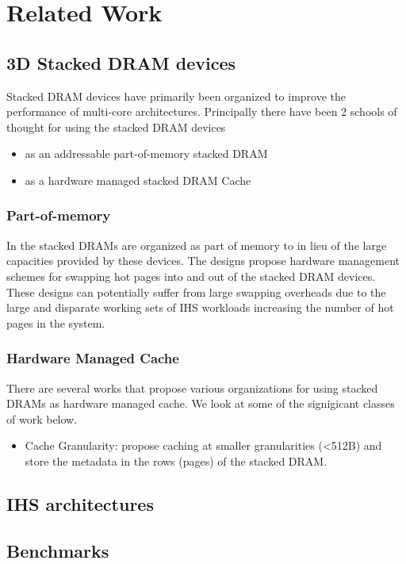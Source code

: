 \chapter{Related Work} \label{related-work}
\section{3D Stacked DRAM devices}
Stacked DRAM devices have primarily been organized to improve the performance of multi-core architectures. Principally there have been 2 schools of thought for using the stacked DRAM devices 
\begin{itemize}
	\item as an addressable part-of-memory stacked DRAM 
	\item as a hardware managed stacked DRAM Cache
\end{itemize}
\subsection{Part-of-memory}
In \cite{pom,cameo} the stacked DRAMs are organized as part of memory to in lieu of the large capacities provided by these devices. The designs propose hardware management schemes for swapping hot pages into and out of the stacked DRAM devices. These designs can potentially suffer from large swapping overheads due to the large and disparate working sets of IHS workloads increasing the number of hot pages in the system.
\subsection{Hardware Managed Cache}
There are several works that propose various organizations for using stacked DRAMs as hardware managed cache. We look at some of the signigicant classes of work below.
\begin{itemize}
\item Cache Granularity: \cite{alloy,loh-hill,atcache,bimodal} propose caching at smaller granularities (<512B) and store the metadata in the rows (pages) of the stacked DRAM.
	
\end{itemize}
\section{IHS architectures}
\section{Benchmarks}